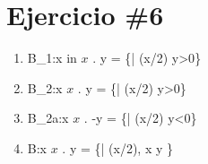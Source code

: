 \documentclass{article}
\begin{document}
\section{Ejercicio \#6}
\begin{enumerate}

\item{B_1:\lambda x  in $x$   . y = \{<x,y>| (x/2) \wedge y>0}\} 

\item{B_2:\lambda x   $x$  . y = \{<x,y>| \neg (x/2) \wedge y>0}\}

\item{B_{2a}:\lambda x   $x$   . -y = \{<x,-y>| \neg (x/2) \wedge y<0}\}

\item{B:\lambda x   $x$   . y = \{<x,y>|  (x/2), x \in {} \wedge y \in {} }\}

       

\end{enumerate}
\end{document}
